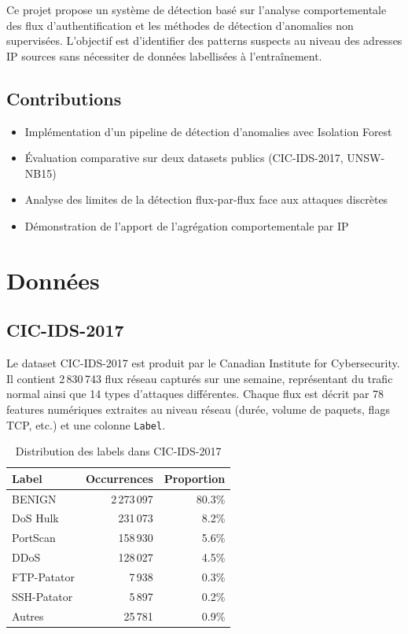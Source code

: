 \documentclass[11pt,a4paper]{article}
\begin{document}
Ce projet propose un système de détection basé sur l'analyse comportementale des
flux d'authentification et les méthodes de détection d'anomalies non supervisées.
L'objectif est d'identifier des patterns suspects au niveau des adresses IP sources
sans nécessiter de données labellisées à l'entraînement.

\subsection*{Contributions}
\begin{itemize}
    \item Implémentation d'un pipeline de détection d'anomalies avec Isolation Forest
    \item Évaluation comparative sur deux datasets publics (CIC-IDS-2017, UNSW-NB15)
    \item Analyse des limites de la détection flux-par-flux face aux attaques discrètes
    \item Démonstration de l'apport de l'agrégation comportementale par IP
\end{itemize}

\section{Données}

\subsection{CIC-IDS-2017}

Le dataset CIC-IDS-2017 \cite{cicids2017} est produit par le Canadian Institute
for Cybersecurity. Il contient 2\,830\,743 flux réseau capturés sur une semaine,
représentant du trafic normal ainsi que 14 types d'attaques différentes.
Chaque flux est décrit par 78 features numériques extraites au niveau réseau
(durée, volume de paquets, flags TCP, etc.) et une colonne \texttt{Label}.

\begin{table}[H]
\centering
\caption{Distribution des labels dans CIC-IDS-2017}
\begin{tabular}{lrr}
\toprule
\textbf{Label} & \textbf{Occurrences} & \textbf{Proportion} \\
\midrule
BENIGN         & 2\,273\,097 & 80.3\% \\
DoS Hulk       & 231\,073    &  8.2\% \\
PortScan       & 158\,930    &  5.6\% \\
DDoS           & 128\,027    &  4.5\% \\
FTP-Patator    &   7\,938    &  0.3\% \\
SSH-Patator    &   5\,897    &  0.2\% \\
Autres         &  25\,781    &  0.9\% \\
\bottomrule
\end{tabular}
\end{table}
\end{document}
